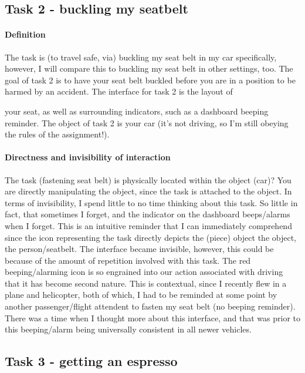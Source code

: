 \subsection{Task 2 - buckling my seatbelt}

\paragraph{Definition}
The task is (to travel safe, via) buckling my seat belt in my car specifically, however, I will compare this to buckling my seat belt in other settings, too. The goal of task 2 is to have your seat belt buckled before you are in a position to be harmed by an accident. The interface for task 2 is the layout of

\clearpage

your seat, as well as surrounding indicators, such as a dashboard beeping reminder. The object of task 2 is your car (it's not driving, so I'm still obeying the rules of the assignment!).

\paragraph{Directness and invisibility of interaction}
The task (fastening seat belt) is physically located within the object (car)? You are directly manipulating the object, since the task is attached to the object. In terms of invisibility, I spend little to no time thinking about this task. So little in fact, that sometimes I forget, and the indicator on the dashboard beeps/alarms when I forget. This is an intuitive reminder that I can immediately comprehend since the icon representing the task directly depicts the (piece) object the object, the person/seatbelt. The interface became invisible, however, this could be because of the amount of repetition involved with this task. The red beeping/alarming icon is so engrained into our action associated with driving that it has become second nature. This is contextual, since I recently flew in a plane and helicopter, both of which, I had to be reminded at some point by another passenger/flight attendent to fasten my seat belt (no beeping reminder). There was a time when I thought more about this interface, and that was prior to this beeping/alarm being universally consistent in all newer vehicles.

\subsection{Task 3 - getting an espresso}

